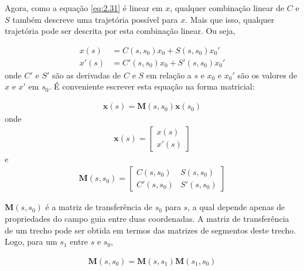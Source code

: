 Agora, como a equação \eqref{eq:2.31} é linear em $x$, qualquer combinação linear de $C$ e $S$ também descreve uma trajetória possível para $x$. Mais que isso, qualquer trajetória pode ser descrita por esta combinação linear. Ou seja,
	
\begin{align}
	x(s) &= C(s,s_0)x_0 + S(s,s_0)x_0'\\
	x'(s) &= C'(s,s_0)x_0 + S'(s,s_0)x_0'
\end{align}
onde $C'$ e $S'$ são as derivadas de $C$ e $S$ em relação a $s$ e $x_0$ e $x_0'$ são os valores de $x$ e $x'$ em $s_0$. É conveniente escrever esta equação na forma matricial:
	
\begin{align}
	\boldsymbol{x}(s)=\boldsymbol{M}(s,s_0)\boldsymbol{x}(s_0)
\end{align}
onde 
\begin{align}
	\boldsymbol{x}(s) = \begin{bmatrix}
	x(s)\\ 
	x'(s)
	\end{bmatrix}
\end{align}
e
\begin{align}
	\boldsymbol{M}(s,s_0) = \begin{bmatrix}
	C(s,s_0) & S(s,s_0)\\
	C'(s,s_0) & S'(s,s_0)
	\end{bmatrix}\label{eq:2.37}
\end{align}
	
$\boldsymbol{M}(s,s_0)$ é a matriz de transferência de $s_0$ para $s$, a qual depende apenas de propriedades do campo guia entre duas coordenadas. A matriz de transferência de um trecho pode ser obtida em termos das matrizes de segmentos deste trecho. Logo, para um $s_1$ entre $s$ e $s_0$,
	
\begin{align}
	\boldsymbol{M}(s,s_0) = \boldsymbol{M}(s,s_1)\boldsymbol{M}(s_1,s_0)
\end{align}
	
